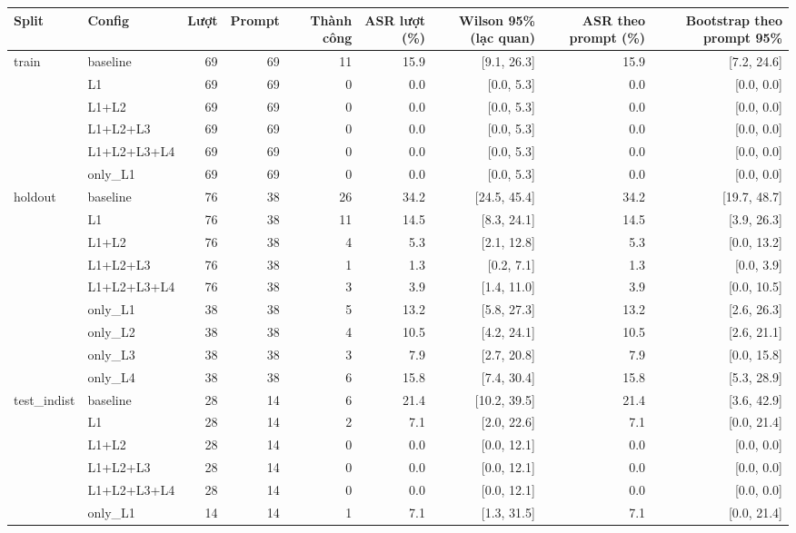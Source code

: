 \begin{tabular}{llrrrrrrr}
\toprule
Split & Config & Lượt & Prompt & Thành công & ASR lượt (\%) & Wilson 95\% (lạc quan) & ASR theo prompt (\%) & Bootstrap theo prompt 95\% \\
\midrule
train & baseline & 69 & 69 & 11 & 15.9 & [9.1, 26.3] & 15.9 & [7.2, 24.6] \\
 & L1 & 69 & 69 & 0 & 0.0 & [0.0, 5.3] & 0.0 & [0.0, 0.0] \\
 & L1+L2 & 69 & 69 & 0 & 0.0 & [0.0, 5.3] & 0.0 & [0.0, 0.0] \\
 & L1+L2+L3 & 69 & 69 & 0 & 0.0 & [0.0, 5.3] & 0.0 & [0.0, 0.0] \\
 & L1+L2+L3+L4 & 69 & 69 & 0 & 0.0 & [0.0, 5.3] & 0.0 & [0.0, 0.0] \\
 & only\_L1 & 69 & 69 & 0 & 0.0 & [0.0, 5.3] & 0.0 & [0.0, 0.0] \\
\midrule
holdout & baseline & 76 & 38 & 26 & 34.2 & [24.5, 45.4] & 34.2 & [19.7, 48.7] \\
 & L1 & 76 & 38 & 11 & 14.5 & [8.3, 24.1] & 14.5 & [3.9, 26.3] \\
 & L1+L2 & 76 & 38 & 4 & 5.3 & [2.1, 12.8] & 5.3 & [0.0, 13.2] \\
 & L1+L2+L3 & 76 & 38 & 1 & 1.3 & [0.2, 7.1] & 1.3 & [0.0, 3.9] \\
 & L1+L2+L3+L4 & 76 & 38 & 3 & 3.9 & [1.4, 11.0] & 3.9 & [0.0, 10.5] \\
 & only\_L1 & 38 & 38 & 5 & 13.2 & [5.8, 27.3] & 13.2 & [2.6, 26.3] \\
 & only\_L2 & 38 & 38 & 4 & 10.5 & [4.2, 24.1] & 10.5 & [2.6, 21.1] \\
 & only\_L3 & 38 & 38 & 3 & 7.9 & [2.7, 20.8] & 7.9 & [0.0, 15.8] \\
 & only\_L4 & 38 & 38 & 6 & 15.8 & [7.4, 30.4] & 15.8 & [5.3, 28.9] \\
\midrule
test\_indist & baseline & 28 & 14 & 6 & 21.4 & [10.2, 39.5] & 21.4 & [3.6, 42.9] \\
 & L1 & 28 & 14 & 2 & 7.1 & [2.0, 22.6] & 7.1 & [0.0, 21.4] \\
 & L1+L2 & 28 & 14 & 0 & 0.0 & [0.0, 12.1] & 0.0 & [0.0, 0.0] \\
 & L1+L2+L3 & 28 & 14 & 0 & 0.0 & [0.0, 12.1] & 0.0 & [0.0, 0.0] \\
 & L1+L2+L3+L4 & 28 & 14 & 0 & 0.0 & [0.0, 12.1] & 0.0 & [0.0, 0.0] \\
 & only\_L1 & 14 & 14 & 1 & 7.1 & [1.3, 31.5] & 7.1 & [0.0, 21.4] \\
\bottomrule
\end{tabular}
